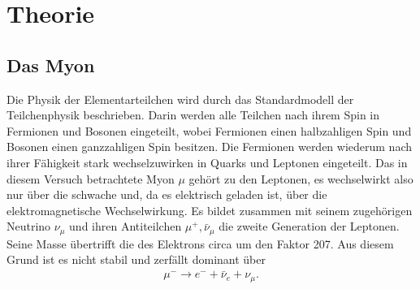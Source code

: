 \section{Theorie}
\label{sec:Theorie}

%
%
%
%
\subsection{Das Myon}

Die Physik der Elementarteilchen wird durch das Standardmodell der Teilchenphysik beschrieben. Darin werden alle Teilchen nach ihrem Spin in Fermionen und Bosonen eingeteilt, wobei Fermionen einen halbzahligen Spin und Bosonen einen ganzzahligen Spin besitzen. Die Fermionen werden wiederum nach ihrer Fähigkeit stark wechselzuwirken in Quarks und Leptonen eingeteilt. Das in diesem Versuch betrachtete Myon $\mu$ gehört zu den Leptonen, es wechselwirkt also nur über die schwache und, da es elektrisch geladen ist, über die elektromagnetische Wechselwirkung.
Es bildet zusammen mit seinem zugehörigen Neutrino $\nu_\mu$ und ihren Antiteilchen $\mu^+, \bar \nu_\mu$ die zweite Generation der Leptonen. Seine Masse übertrifft die des Elektrons circa um den Faktor \num{207}. Aus diesem Grund ist es nicht stabil und zerfällt dominant über
\begin{align}
  \mu^- \to e^- + \bar \nu_e + \nu_\mu. \label{eqn:myonzerfall}
\end{align}

